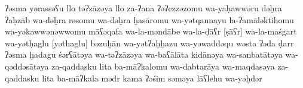 \begin{transliteration}
    ʔəsma yərassəʕu llo təʔzāzəya
    llo za-ʔana ʔəʔezzəzomu wa-yaḥawwəru dəḫra ʔaḥzāb wa-dəḫra
    rəsomu wa-dəḫra ḫasāromu wa-yətqan\-nayu la-ʔamāləktihomu
    wa-yəkawwənəwwomu māʕəqafa wa-la-məndābe wa-la-ḍāʕr [ṣāʕr] wa-la-maśgart
    wa-yətḥaglu [yəthaglu] bəzuḫān wa-yətʔaḫḫazu wa-yəwaddəqu wəsta
    ʔəda ḍarr ʔəsma ḫadagu śərʕātəya wa-təʔzāzəya wa-baʕālāta
    kidānǝya wa-sanbatātǝya wa-qəddǝsātǝya za-qaddasku lita ba-māʔkalomu
    wa-dabtarāya wa-maqdasǝya za-qaddasku lita ba-māʔkala
    mədr kama ʔəśim səməya lāʕlehu wa-yəḫdər

\end{transliteration}
